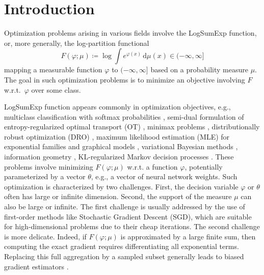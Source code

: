 \documentclass{article}
\newcommand{\dd}{\,\mathrm{d}}
\newcommand*{\eqset}{\coloneqq}
\theoremstyle{plain}
\theoremstyle{definition}
\theoremstyle{remark}
\begin{document}
\section{Introduction}\label{sec:intro}

Optimization problems arising in various fields involve the LogSumExp function, or, more generally, the log-partition functional
\begin{equation}\label{def:F}
    F(\varphi; \mu) \eqset \log \int e^{\varphi(x)} \dd \mu(x) \in (-\infty, \infty] 
\end{equation}
mapping a measurable function $\varphi$ to $(-\infty, \infty]$ based on a probability measure $\mu$. The goal in such optimization problems is to minimize an objective involving $F$ w.r.t.\ $\varphi$ over some class.

LogSumExp function appears commonly in optimization objectives, e.g., multiclass classification with softmax probabilities \citep{bishop2006pattern},
semi-dual formulation of entropy-regularized optimal transport (OT) \citep{peyre2018computational,genevay2016stochastic},
minimax problems \citep{pee2011solving},
distributionally robust optimization (DRO) \citep{huKullbackLeiblerDivergenceConstrained,ben-tal_robust_2013,kuhnDistributionallyRobustOptimization2024}, maximum likelihood estimation (MLE) for exponential families and graphical models \citep{wainwright2008graphical},
variational Bayesian methods \citep{khan2018fast,khanBayesianLearningRule2023},
information geometry \citep{amariMethodsInformationGeometry2000},
KL-regularized Markov decision processes \citep{tiapkin2024demonstrationregularized}.
These problems involve minimizing $F(\varphi; \mu)$ w.r.t. a function $\varphi$, potentially parameterized by a vector $\theta$, e.g., a vector of neural network weights.
Such optimization is characterized by two challenges. First, the decision variable $\varphi$ or $\theta$ often has large or infinite dimension.
Second, the support of the measure $\mu$ can also be large or infinite. 
The first challenge is usually addressed by the use of first-order methods like Stochastic Gradient Descent (SGD), which are suitable for high-dimensional problems due to their cheap iterations. 
The second challenge is more delicate. Indeed, if $F(\varphi;\mu)$ is approximated by a large finite sum, then computing the exact gradient requires differentiating all exponential terms. Replacing this full aggregation by a sampled subset generally leads to biased gradient estimators \citep{lin2026sampled}.

\end{document}
